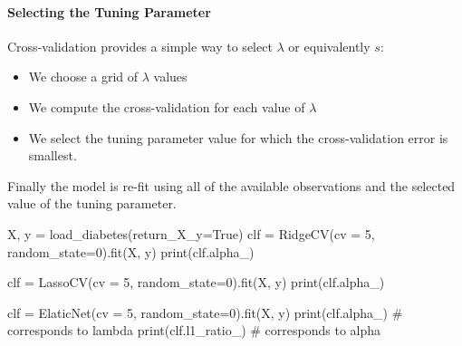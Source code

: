 \paragraph{Selecting the Tuning Parameter}
Cross-validation provides a simple way to select $\lambda$ or 
equivalently $s$:\\
\begin{itemize}
	\item We choose a grid of $\lambda$ values
	\item We compute the cross-validation for each value of 
		$\lambda$
	\item We select the tuning parameter value for which the 
		cross-validation error is smallest.
\end{itemize}
Finally the model is re-fit using all of the available observations and
the selected value of the tuning parameter.
\begin{python}
X, y = load_diabetes(return_X_y=True)
clf = RidgeCV(cv = 5, random_state=0).fit(X, y)
print(clf.alpha_)

clf = LassoCV(cv = 5, random_state=0).fit(X, y)
print(clf.alpha_)

clf = ElaticNet(cv = 5, random_state=0).fit(X, y)
print(clf.alpha_) # corresponds to lambda
print(clf.l1_ratio_) # corresponds to alpha
\end{python}

